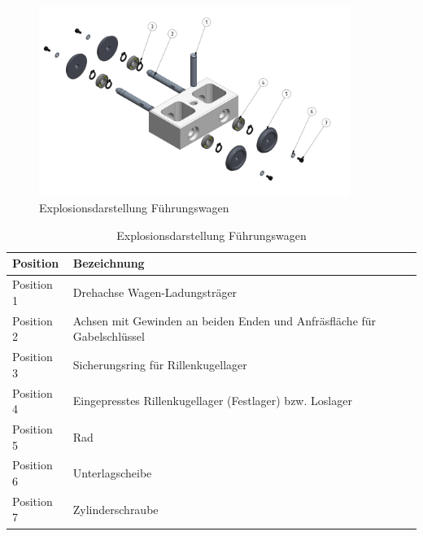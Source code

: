 \documentclass[../../main.tex]{subfiles}
\begin{document}
     \begin{figure}[H] %
        \centering
        \includegraphics[width=0.9\textwidth]{Fuehrungswagen.png}
        \caption{Explosionsdarstellung Führungswagen}
        \label{fig:expl_fuehrungswagen}
    \end{figure}

    \begin{table}[H] \centering
        \begin{tabular}{|l|l|}
        \hline
        \textbf{Position} & \textbf{Bezeichnung}\\
        \hline
        Position 1          & Drehachse Wagen-Ladungsträger\\
         \hline
        Position 2          & Achsen mit Gewinden an beiden Enden und Anfräsfläche für Gabelschlüssel\\
         \hline
        Position 3          & Sicherungsring für Rillenkugellager\\
        \hline
        Position 4          & Eingepresstes Rillenkugellager (Festlager) bzw. Loslager\\
        \hline       
        Position 5          & Rad\\
        \hline
        Position 6          & Unterlagscheibe\\
        \hline
        Position 7          & Zylinderschraube\\
        \hline
        \end{tabular}
        
        \caption{Explosionsdarstellung Führungswagen}
        \label{tab:expl_fuehrungswagen}
        \end{table}
    \newpage
    
\end{document}
